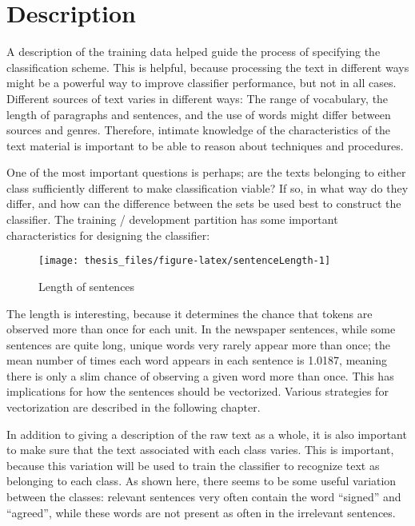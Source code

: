 \documentclass[12pt,twoside]{reedthesis}
\begin{document}
\newpage

\section{Description}\label{description}

A description of the training data helped guide the process of
specifying the classification scheme. This is helpful, because
processing the text in different ways might be a powerful way to improve
classifier performance, but not in all cases. Different sources of text
varies in different ways: The range of vocabulary, the length of
paragraphs and sentences, and the use of words might differ between
sources and genres. Therefore, intimate knowledge of the characteristics
of the text material is important to be able to reason about techniques
and procedures.

One of the most important questions is perhaps; are the texts belonging
to either class sufficiently different to make classification viable? If
so, in what way do they differ, and how can the difference between the
sets be used best to construct the classifier. The training /
development partition has some important characteristics for designing
the classifier:
\begin{figure}

\texttt{[image: thesis\_files/figure-latex/sentenceLength-1]} \hfill{}

\caption{Length of sentences}\label{fig:sentenceLength}
\end{figure}
The length is interesting, because it determines the chance that tokens
are observed more than once for each unit. In the newspaper sentences,
while some sentences are quite long, unique words very rarely appear
more than once; the mean number of times each word appears in each
sentence is 1.0187, meaning there is only a slim chance of observing a
given word more than once. This has implications for how the sentences
should be vectorized. Various strategies for vectorization are described
in the following chapter.

In addition to giving a description of the raw text as a whole, it is
also important to make sure that the text associated with each class
varies. This is important, because this variation will be used to train
the classifier to recognize text as belonging to each class. As shown
here, there seems to be some useful variation between the classes:
relevant sentences very often contain the word ``signed'' and
``agreed'', while these words are not present as often in the irrelevant
sentences.
\end{document}
